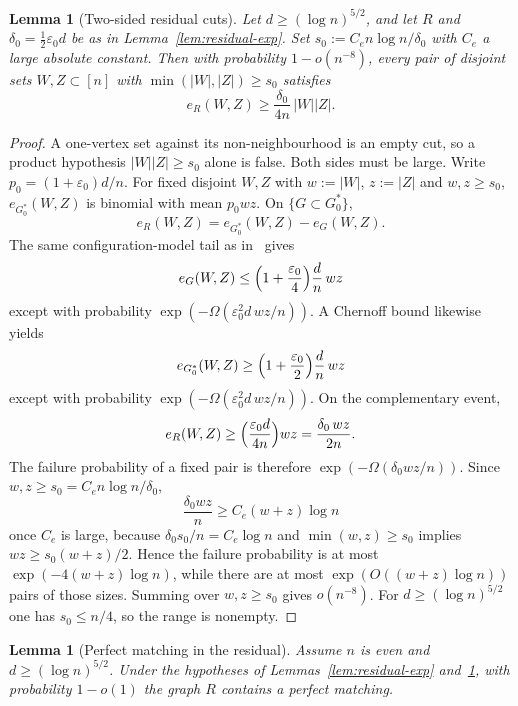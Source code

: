 \documentclass[11pt]{article}
\newtheorem{lemma}[theorem]{Lemma}
\begin{document}
\begin{lemma}[Two-sided residual cuts]
\label{lem:residual-cuts}
Let \(d\ge(\log n)^{5/2}\), and let \(R\) and \(\delta_0=\tfrac12\varepsilon_0 d\) be as in
Lemma~\ref{lem:residual-exp}.
Set \(s_0:=C_e n\log n/\delta_0\) with \(C_e\) a large absolute constant.
Then with probability \(1-o(n^{-8})\), every pair of disjoint sets
\(W,Z\subset[n]\) with \(\min(|W|,|Z|)\ge s_0\) satisfies
\[
e_R(W,Z)\ge\frac{\delta_0}{4n}\,|W||Z|.
\]
\end{lemma}

\begin{proof}
A one-vertex set against its non-neighbourhood is an empty cut, so a product
hypothesis \(|W||Z|\ge s_0\) alone is false.
Both sides must be large.
Write \(p_0=(1+\varepsilon_0)d/n\).
For fixed disjoint \(W,Z\) with \(w:=|W|\), \(z:=|Z|\) and \(w,z\ge s_0\),
\(e_{G^*_0}(W,Z)\) is binomial with mean \(p_0 wz\).
On \(\{G\subset G^*_0\}\),
\[
e_R(W,Z)=e_{G^*_0}(W,Z)-e_G(W,Z).
\]
The same configuration-model tail as in~\cite[Appendix~A]{BIM25} gives
\[
e_G(W,Z)\le\Bigl(1+\frac{\varepsilon_0}{4}\Bigr)\frac{d}{n}\,wz
\]
except with probability \(\exp(-\Omega(\varepsilon_0^2 d\, wz/n))\).
A Chernoff bound likewise yields
\[
e_{G^*_0}(W,Z)\ge\Bigl(1+\frac{\varepsilon_0}{2}\Bigr)\frac{d}{n}\,wz
\]
except with probability \(\exp(-\Omega(\varepsilon_0^2 d\, wz/n))\).
On the complementary event,
\[
e_R(W,Z)\ge\Bigl(\frac{\varepsilon_0 d}{4n}\Bigr)wz=\frac{\delta_0\, wz}{2n}.
\]
The failure probability of a fixed pair is therefore
\(\exp(-\Omega(\delta_0 wz/n))\).
Since \(w,z\ge s_0=C_e n\log n/\delta_0\),
\[
\frac{\delta_0 wz}{n}\ge C_e(w+z)\log n
\]
once \(C_e\) is large, because
\(\delta_0 s_0/n=C_e\log n\) and \(\min(w,z)\ge s_0\) implies
\(wz\ge s_0(w+z)/2\).
Hence the failure probability is at most
\(\exp(-4(w+z)\log n)\), while there are at most
\(\exp(O((w+z)\log n))\) pairs of those sizes.
Summing over \(w,z\ge s_0\) gives \(o(n^{-8})\).
For \(d\ge(\log n)^{5/2}\) one has \(s_0\le n/4\), so the range is nonempty.
\end{proof}

\begin{lemma}[Perfect matching in the residual]
\label{lem:perfect-matching}
Assume \(n\) is even and \(d\ge(\log n)^{5/2}\).
Under the hypotheses of Lemmas~\ref{lem:residual-exp} and~\ref{lem:residual-cuts},
with probability \(1-o(1)\) the graph \(R\) contains a perfect matching.
\end{lemma}
\end{document}
